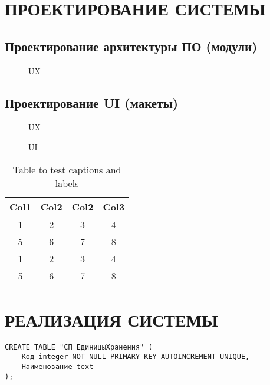 \documentclass[
  12pt, %
  a4paper, %
  simple, %
  floatsection %
]{eskdtext}
\begin{document}
\newpage
\section{ПРОЕКТИРОВАНИЕ СИСТЕМЫ}

\subsection{Проектирование архитектуры ПО (модули)}

\begin{figure}[!h]
    \centering
    \caption{UX}
\end{figure}

\subsection{Проектирование UI (макеты)}

\begin{figure}[!h]
    \centering
    \caption{UX}
\end{figure}

\begin{figure}[!h]
    \centering
    \caption{UI}
\end{figure}

\begin{table}[h!]
    \centering
    \begin{tabular}{|c|c|c|c|} 
        \hline
        Col1 & Col2 & Col2 & Col3 \\
        \hline
        1 & 2 & 3 & 4 \\ \hline
        5 & 6 & 7 & 8 \\ \hline
        1 & 2 & 3 & 4 \\ \hline
        5 & 6 & 7 & 8 \\ \hline
    \end{tabular}
    \caption{Table to test captions and labels}
    \label{table:1}
\end{table}

\newpage
\section{РЕАЛИЗАЦИЯ СИСТЕМЫ}

\begin{lstlisting}[name=Справочник "Единицы хранения"]
CREATE TABLE "СП_ЕдиницыХранения" (
    Код integer NOT NULL PRIMARY KEY AUTOINCREMENT UNIQUE,
    Наименование text
);
\end{lstlisting}
\end{document}
